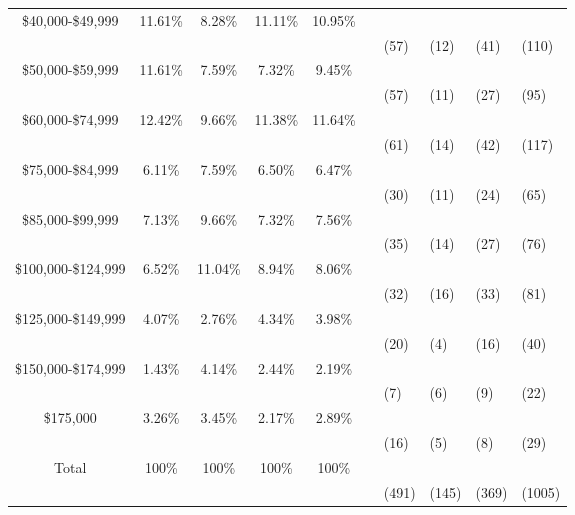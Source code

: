 \documentclass{article}
\begin{document}
\begin{table}
\begin{center}
\begin{tabular}{ccccc}
\$40,000-\$49,999	&	11.61\%	&	8.28\%	&	11.11\%	&	10.95\%	\\
& & & & & &	(57)	&	(12)	&	(41)	&	(110)                               \\
\$50,000-\$59,999	&	11.61\%	&	7.59\%	&	7.32\%	&	9.45\%	\\
& & & & & &	(57)	&	(11)	&	(27)	&	(95)	                            \\
\$60,000-\$74,999	&	12.42\%	&	9.66\%	&	11.38\%	&	11.64\%	\\
& & & & & &	(61)	&	(14)	&	(42)	&	(117)	                            \\
\$75,000-\$84,999	&	6.11\%	&	7.59\%	&	6.50\%	&	6.47\%	\\
& & & & & &	(30)	&	(11)	&	(24)	&	(65)                                \\
\$85,000-\$99,999	&	7.13\%	&	9.66\%	&	7.32\%	&	7.56\%	\\
& & & & & &	(35)	&	(14)	&	(27)	&	(76)                                \\
\$100,000-\$124,999	&	6.52\%	&	11.04\%	&	8.94\%	&	8.06\%	\\
& & & & & &	(32)	&	(16)	&	(33)	&	(81)                                \\
\$125,000-\$149,999	&	4.07\%	&	2.76\%	&	4.34\%	&	3.98\%	\\
& & & & & &	(20)	&	(4)	&	(16)	&	(40)	                                \\
\$150,000-\$174,999	&	1.43\%	&	4.14\%	&	2.44\%	&	2.19\%	\\
& & & & & &	(7)	&	(6)	&	(9)	&	(22)	                                        \\
\$175,000 \geq	&	3.26\%	&	3.45\%	&	2.17\%	&	2.89\%    	\\
& & & & & &	(16)	&	(5)	&	(8)	&	(29)                                        \\
Total	&	100\%	&	100\%	&	100\%	&	100\%                           	\\
& & & & & &	(491)	&	(145)	&	(369)	&	(1005)
\end{tabular}
\end{center}
\end{table}
\end{document}
